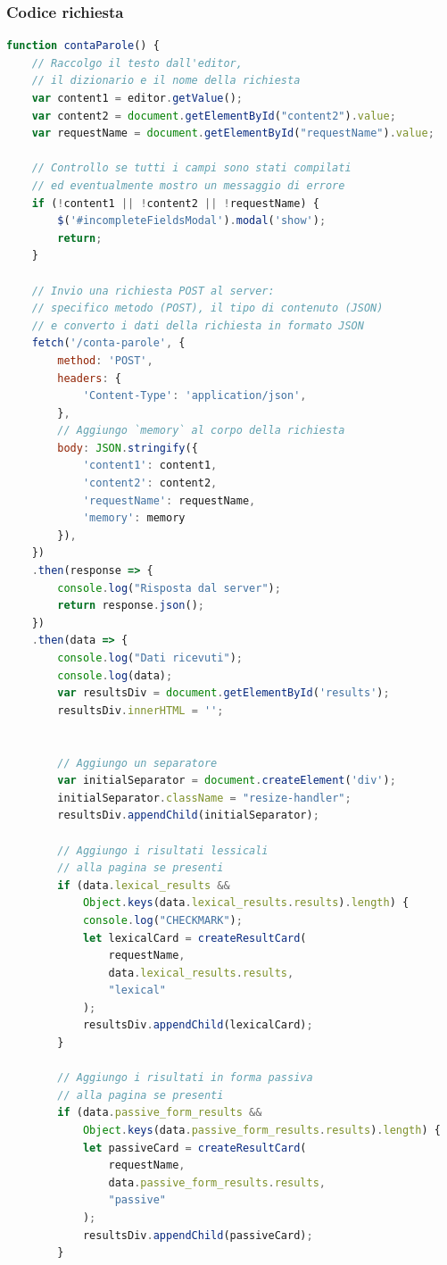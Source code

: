 \documentclass[12pt]{report}
\begin{document}
\subsubsection{Codice richiesta}
\begin{lstlisting}[language=JavaScript]
function contaParole() {
    // Raccolgo il testo dall'editor,
    // il dizionario e il nome della richiesta
    var content1 = editor.getValue();
    var content2 = document.getElementById("content2").value;
    var requestName = document.getElementById("requestName").value;

    // Controllo se tutti i campi sono stati compilati
    // ed eventualmente mostro un messaggio di errore
    if (!content1 || !content2 || !requestName) {
        $('#incompleteFieldsModal').modal('show');
        return;
    }

    // Invio una richiesta POST al server:
    // specifico metodo (POST), il tipo di contenuto (JSON)
    // e converto i dati della richiesta in formato JSON
    fetch('/conta-parole', {
        method: 'POST',
        headers: {
            'Content-Type': 'application/json',
        },
        // Aggiungo `memory` al corpo della richiesta
        body: JSON.stringify({
            'content1': content1,
            'content2': content2,
            'requestName': requestName,
            'memory': memory
        }),
    })
    .then(response => {
        console.log("Risposta dal server");
        return response.json();
    })
    .then(data => {
        console.log("Dati ricevuti");
        console.log(data);
        var resultsDiv = document.getElementById('results');
        resultsDiv.innerHTML = '';


        // Aggiungo un separatore
        var initialSeparator = document.createElement('div');
        initialSeparator.className = "resize-handler";
        resultsDiv.appendChild(initialSeparator);

        // Aggiungo i risultati lessicali
        // alla pagina se presenti
        if (data.lexical_results &&
            Object.keys(data.lexical_results.results).length) {
            console.log("CHECKMARK");
            let lexicalCard = createResultCard(
                requestName,
                data.lexical_results.results,
                "lexical"
            );
            resultsDiv.appendChild(lexicalCard);
        }

        // Aggiungo i risultati in forma passiva
        // alla pagina se presenti
        if (data.passive_form_results &&
            Object.keys(data.passive_form_results.results).length) {
            let passiveCard = createResultCard(
                requestName,
                data.passive_form_results.results,
                "passive"
            );
            resultsDiv.appendChild(passiveCard);
        }


\end{lstlisting}
\end{document}

